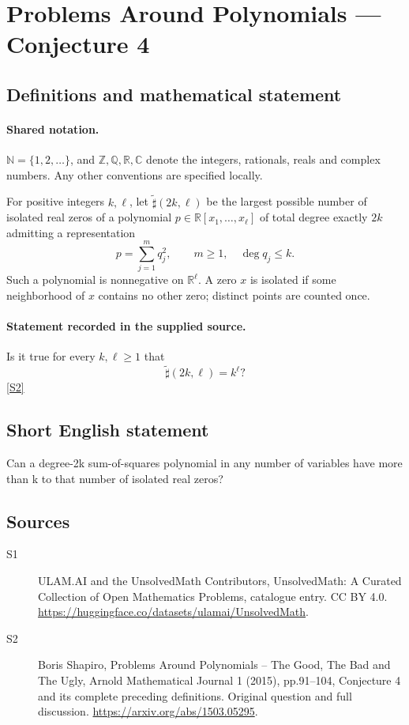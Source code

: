 \documentclass[11pt]{article}
\newcommand{\sref}[2]{\hyperlink{source:#1:#2}{[S#2]}}
\begin{document}
\section{Problems Around Polynomials — Conjecture 4}\label{statement}

\subsection{Definitions and mathematical statement}

\paragraph{Shared notation.}$\mathbb N=\{1,2,\ldots\}$, and $\mathbb Z,\mathbb Q,\mathbb R,\mathbb C$ denote the integers, rationals, reals and complex numbers. Any other conventions are specified locally.


For positive integers $k,\ell$, let $\widetilde\sharp(2k,\ell)$ be the largest possible number of isolated real zeros of a polynomial $p\in\mathbb R[x_1,\ldots,x_\ell]$ of total degree exactly $2k$ admitting a representation
\[p=\sum_{j=1}^m q_j^2,\qquad m\geq1,\quad\deg q_j\leq k.\]
Such a polynomial is nonnegative on $\mathbb R^\ell$. A zero $x$ is isolated if some neighborhood of $x$ contains no other zero; distinct points are counted once.
\paragraph{Statement recorded in the supplied source.}
Is it true for every $k,\ell\geq1$ that
\[\widetilde\sharp(2k,\ell)=k^\ell?\] \sref{statement}{2}
\subsection{Short English statement}
Can a degree-2k sum-of-squares polynomial in any number of variables have more than k to that number of isolated real zeros?
\subsection{Sources}
\begin{description}
\item[\hypertarget{source:statement:1}{S1}] ULAM.AI and the UnsolvedMath Contributors, UnsolvedMath: A Curated Collection of Open Mathematics Problems, catalogue entry. CC BY 4.0. \url{https://huggingface.co/datasets/ulamai/UnsolvedMath}.
\item[\hypertarget{source:statement:2}{S2}] Boris Shapiro, Problems Around Polynomials -- The Good, The Bad and The Ugly, Arnold Mathematical Journal 1 (2015), pp.91--104, Conjecture 4 and its complete preceding definitions. Original question and full discussion. \url{https://arxiv.org/abs/1503.05295}.

\end{description}
\label{end:statement}
\end{document}

